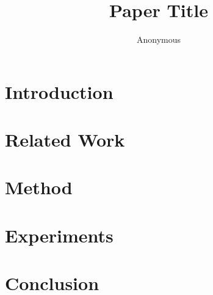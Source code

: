 \documentclass[10pt,sigconf,anonymous]{acmart}
\begin{document}
\title{Paper Title}

\author{Anonymous}
\email{}

\renewcommand{\shortauthors}{Anonymous}

\begin{abstract}
\end{abstract}


\maketitle

\section{Introduction}

\section{Related Work}

\section{Method}

\section{Experiments}

\section{Conclusion}



\end{document}
